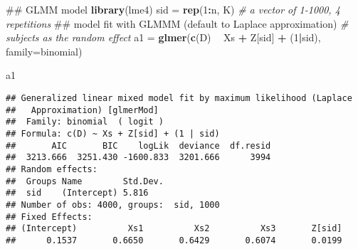 \documentclass[]{book}
\newenvironment{Shaded}{\begin{snugshade}}{\end{snugshade}}
\newcommand{\KeywordTok}[1]{\textcolor[rgb]{0.13,0.29,0.53}{\textbf{#1}}}
\newcommand{\DataTypeTok}[1]{\textcolor[rgb]{0.13,0.29,0.53}{#1}}
\newcommand{\DecValTok}[1]{\textcolor[rgb]{0.00,0.00,0.81}{#1}}
\newcommand{\StringTok}[1]{\textcolor[rgb]{0.31,0.60,0.02}{#1}}
\newcommand{\CommentTok}[1]{\textcolor[rgb]{0.56,0.35,0.01}{\textit{#1}}}
\newcommand{\OperatorTok}[1]{\textcolor[rgb]{0.81,0.36,0.00}{\textbf{#1}}}
\newcommand{\NormalTok}[1]{#1}
\begin{document}
\begin{Shaded}
\begin{Highlighting}[]
\NormalTok{## GLMM model}
\KeywordTok{library}\NormalTok{(lme4)}
\NormalTok{sid =}\StringTok{ }\KeywordTok{rep}\NormalTok{(}\DecValTok{1}\OperatorTok{:}\NormalTok{n, K) }\CommentTok{# a vector of 1-1000, 4 repetitions}
\NormalTok{## model fit with GLMMM (default to Laplace approximation)}
\CommentTok{# subjects as the random effect}
\NormalTok{a1 =}\StringTok{ }\KeywordTok{glmer}\NormalTok{(}\KeywordTok{c}\NormalTok{(D) }\OperatorTok{~}\StringTok{ }\NormalTok{Xs }\OperatorTok{+}\StringTok{ }\NormalTok{Z[sid] }\OperatorTok{+}\StringTok{ }\NormalTok{(}\DecValTok{1}\OperatorTok{|}\NormalTok{sid), }\DataTypeTok{family=}\NormalTok{binomial)}

\NormalTok{a1}
\end{Highlighting}
\end{Shaded}

\begin{verbatim}
## Generalized linear mixed model fit by maximum likelihood (Laplace
##   Approximation) [glmerMod]
##  Family: binomial  ( logit )
## Formula: c(D) ~ Xs + Z[sid] + (1 | sid)
##       AIC       BIC    logLik  deviance  df.resid 
##  3213.666  3251.430 -1600.833  3201.666      3994 
## Random effects:
##  Groups Name        Std.Dev.
##  sid    (Intercept) 5.816   
## Number of obs: 4000, groups:  sid, 1000
## Fixed Effects:
## (Intercept)          Xs1          Xs2          Xs3       Z[sid]  
##      0.1537       0.6650       0.6429       0.6074       0.0199
\end{verbatim}
\end{document}
